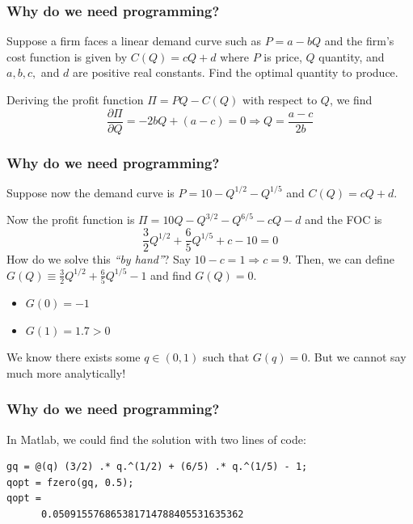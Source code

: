 \documentclass[11pt,xcolor={svgnames},aspectratio=169,usepdftitle=false]{beamer}
\begin{document}
\begin{frame}[c]
  \frametitle{Why do we need programming?}
  \begin{exercise}
   Suppose a firm faces a linear demand curve such as $P = a - b Q$ and the firm's cost function is given by $C(Q) = cQ + d$ where $P$ is price, $Q$ quantity, and $a,b,c,$ and $d$ are positive real constants. Find the optimal quantity to produce.
  \end{exercise}
  \pause
  \begin{solution}
   Deriving the profit function $\Pi = PQ - C(Q)$ with respect to $Q$, we find
   \[
     \frac{\partial \Pi}{\partial Q} = -2b Q + (a - c) = 0 \Rightarrow Q = \frac{a - c}{2b} 
   \]
  \end{solution}
  
\end{frame}

\begin{frame}[c]
  \frametitle{Why do we need programming?}
 \begin{exercise}
   Suppose now the demand curve is $P = 10 - Q^{1/2} - Q^{1/5}$ and $C(Q) = cQ + d$.
 \end{exercise}

 \begin{solution}
   Now the profit function is $\Pi = 10Q - Q^{3/2} - Q^{6/5} - cQ - d$ and the FOC is 
   \[
     \frac{3}{2} Q^{1/2} + \frac{6}{5}Q^{1/5} + c - 10 = 0 
   \]
   How do we solve this \textit{``by hand''}? Say $10 - c = 1 \Rightarrow c = 9$. Then, we can define $G(Q) \equiv \frac{3}{2} Q^{1/2} + \frac{6}{5}Q^{1/5} - 1$ and find $G(Q) = 0$.
   \begin{itemize}
    \item $G(0) = -1$
    \item $G(1) = 1.7 > 0$
   \end{itemize}
   We know there exists some $q\in(0,1)$ such that $G(q) = 0$. But we cannot say much more analytically!
 \end{solution}
 
\end{frame}

\begin{frame}[fragile]
  \frametitle{Why do we need programming?}
 \begin{solution}
 In Matlab, we could find the solution with two lines of code: 
 \end{solution} 
 \begin{lstlisting}
gq = @(q) (3/2) .* q.^(1/2) + (6/5) .* q.^(1/5) - 1;
qopt = fzero(gq, 0.5);
qopt = 
      0.050915576865381714788405531635362
 \end{lstlisting}
\end{frame}
\end{document}
